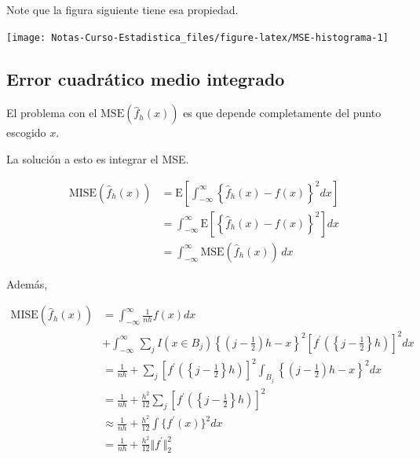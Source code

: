 \documentclass[
  12pt,
]{book}
\theoremstyle{definition}
\theoremstyle{definition}
\theoremstyle{definition}
\theoremstyle{remark}
\begin{document}
Note que la figura siguiente tiene esa propiedad.

\begin{center}\texttt{[image: Notas-Curso-Estadistica\_files/figure-latex/MSE-histograma-1]} \end{center}

\hypertarget{error-cuadruxe1tico-medio-integrado}{%
\subsection{Error cuadrático medio integrado}\label{error-cuadruxe1tico-medio-integrado}}

El problema con el \(\mathrm{MSE}\left( \hat{f}_h(x)\right)\) es que depende completamente del punto escogido \(x\).

La solución a esto es integrar el MSE.

\begin{align*}
\mathrm{MISE}\left(  \hat{f}_h(x)\right)
& = \mathrm{E}\left[
\int_{ -\infty}^{\infty} \left\{
\hat{f}_h(x) - f(x)
\right\}^2 dx
\right]                                                       \\
& = \int_{ -\infty}^{\infty} \mathrm{E}\left[
\left\{
\hat{f}_h(x) - f(x)
\right\}^2
\right] dx                                                    \\
& = \int_{ -\infty}^{\infty}\mathrm{MSE}(\hat{f}_h(x)) \, dx
\end{align*}

Además,

\begin{align*}
\mathrm{MISE} (\hat{f}_h(x))
& = \int_{ -\infty}^{\infty} \frac{1}{nh} f(x)dx                                                                                                                                          \\
& + \int_{ -\infty}^{\infty}\, \sum_{j}^{} I(x\in B_j) \left\{ \left( j- \frac{1}{2} \right)h -x  \right\}^2 \left [f^\prime \left( \left\{j - \frac{1}{2}\right\}h \right)  \right]^2 dx \\
& = \frac{1}{nh} + \sum_{j}^{} \left [f^\prime \left( \left\{j - \frac{1}{2}\right\}h \right)  \right]^2 \int_{ B_j}    \left\{ \left( j- \frac{1}{2} \right)h -x  \right\}^2 dx          \\
& =\frac{1}{nh} + \frac{h^2}{12} \sum_{j} \left [f^\prime \left( \left\{j - \frac{1}{2}\right\}h \right)  \right]^2                                                                       \\
& \approx \frac{1}{nh} + \frac{h^2}{12} \int \{f^\prime(x)\}^2 dx                                                                                                                         \\
& =\frac{1}{nh} + \frac{h^2}{12} \Vert f^\prime\Vert_{2}^2
\end{align*}
\end{document}
